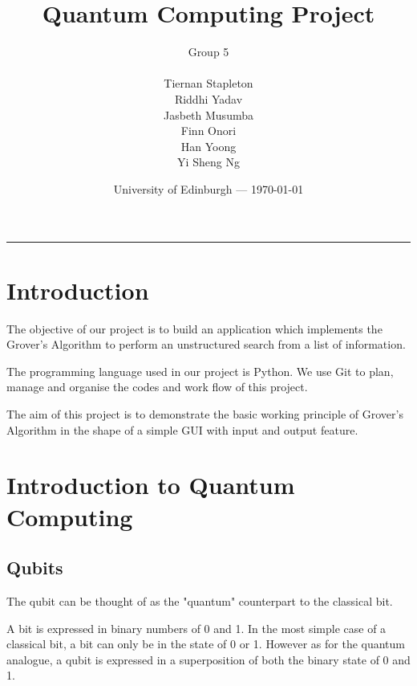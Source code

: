 \documentclass{article}
\title{Quantum Computing Project} %
\author{Group 5 \\ \\ Tiernan Stapleton\\ Riddhi Yadav\\ Jasbeth Musumba \\ Finn Onori \\ Han Yoong  \\ Yi Sheng Ng}  %
\date{University of Edinburgh --- \today} %
\begin{document}
\maketitle %

\vspace{10mm}
\hrule

\vspace{10mm}

\section*{Introduction} %
\vspace{10mm}

The objective of our project is to build an application which implements the Grover's Algorithm to perform an unstructured search from a list of information.
\vspace{5mm}

\noindent
The programming language used in our project is Python. We use Git to plan, manage and organise the codes and work flow of this project. 
\vspace{5mm}

\noindent
The aim of this project is to demonstrate the basic working principle of Grover's Algorithm in the shape of a simple GUI with input and output feature.
\pagebreak

\tableofcontents %
\pagebreak

\section{Introduction to Quantum Computing}
\vspace{5mm}

\subsection{Qubits}
\vspace{5mm}

The qubit can be thought of as the "quantum" counterpart to the classical bit. 
\vspace{5mm}

\noindent
A bit is expressed in binary numbers of 0 and 1. In the most simple case of a classical bit, a bit can only be in the state of 0 or 1. However as for the quantum analogue, a qubit is expressed in a superposition of both the binary state of 0 and 1.
\vspace{5mm}
\end{document}
